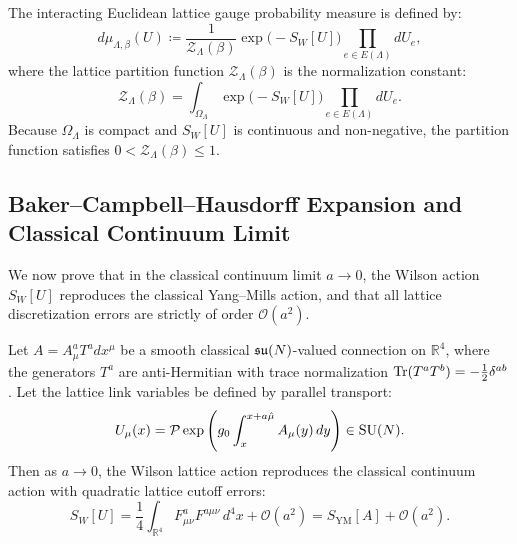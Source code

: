The interacting Euclidean lattice gauge probability measure is defined by:
\begin{equation}
\label{eq:lattice_measure_ch2}
d\mu_{\Lambda, \beta}(U) \coloneqq \frac{1}{\mathcal{Z}_\Lambda(\beta)} \exp\bigl( -S_W[U] \bigr) \prod_{e \in E(\Lambda)} dU_e,
\end{equation}
where the lattice partition function $\mathcal{Z}_\Lambda(\beta)$ is the normalization constant:
\begin{equation}
\label{eq:lattice_partition_fn}
\mathcal{Z}_\Lambda(\beta) = \int_{\Omega_\Lambda} \exp\bigl( -S_W[U] \bigr) \prod_{e \in E(\Lambda)} dU_e.
\end{equation}
Because $\Omega_\Lambda$ is compact and $S_W[U]$ is continuous and non-negative, the partition function satisfies $0 < \mathcal{Z}_\Lambda(\beta) \le 1$.

\subsection{Baker--Campbell--Hausdorff Expansion and Classical Continuum Limit}
\label{subsec:bch_continuum_limit}
We now prove that in the classical continuum limit $a \to 0$, the Wilson action $S_W[U]$ reproduces the classical Yang--Mills action, and that all lattice discretization errors are strictly of order $\mathcal{O}(a^2)$.
\begin{proposition}
\label{prop:classical_continuum_limit}
Let $A = A_\mu^a T^a dx^\mu$ be a smooth classical $\mathfrak{su}(N)$-valued connection on $\mathbb{R}^4$, where the generators $T^a$ are anti-Hermitian with trace normalization $\mathrm{Tr}(T^a T^b) = -\tfrac{1}{2} \delta^{ab}$. Let the lattice link variables be defined by parallel transport:
\begin{equation}
\label{eq:parallel_transport_link}
U_\mu(x) = \mathcal{P} \exp\left( g_0 \int_x^{x + a\hat{\mu}} A_\mu(y) \, dy \right) \in \mathrm{SU}(N).
\end{equation}
Then as $a \to 0$, the Wilson lattice action reproduces the classical continuum action with quadratic lattice cutoff errors:
\begin{equation}
S_W[U] = \frac{1}{4} \int_{\mathbb{R}^4} F_{\mu\nu}^a F^{a\mu\nu} \, d^4x + \mathcal{O}(a^2) = S_{\mathrm{YM}}[A] + \mathcal{O}(a^2).
\end{equation}
\end{proposition}

